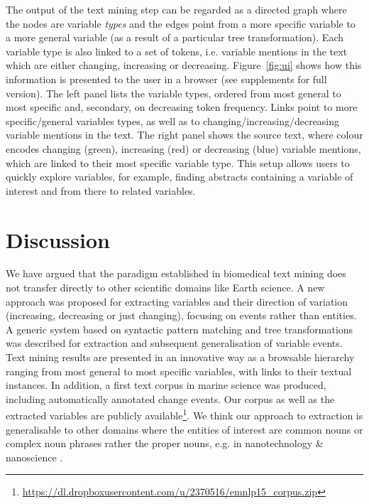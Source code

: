 \documentclass[11pt]{article}
\begin{document}
The output of the text mining step can be regarded as a directed graph where the nodes are variable \emph{types} and the edges point from a more specific variable to a more general variable (as a result of a particular tree transformation).
Each variable type is also linked to a set of tokens, i.e. variable mentions in the text which are either changing, increasing or decreasing.
Figure~\ref{fig:ui}  shows how this information is presented to the user in a browser (see supplements for full version).
The left panel lists the variable types, ordered from most general to most specific and, secondary, on decreasing token frequency.
Links point to more specific/general variables types, as well as to changing/increasing/decreasing variable mentions in the text.
The right panel shows the source text, where colour encodes changing (green), increasing (red) or decreasing (blue) variable mentions, which are linked to their most specific variable type.
This setup allows users to quickly explore variables, for example, finding abstracts containing a variable of interest and from there to related variables.   
 
\section{Discussion}

We have argued that the paradigm established in biomedical text mining does not transfer directly to other scientific domains like Earth science.
A new approach was proposed for extracting variables and their direction of variation (increasing, decreasing or just changing), focusing on events rather than entities.
A generic system based on syntactic pattern matching and tree transformations was described for extraction and subsequent generalisation of variable events.
Text mining results are presented in an innovative way as a browsable hierarchy ranging from most general to most specific variables, with links to their textual instances.
In addition, a first text corpus in marine science was produced, including automatically annotated change events.
Our corpus as well as the extracted variables are publicly available\footnote{\url{https://dl.dropboxusercontent.com/u/2370516/emnlp15_corpus.zip}}.
We think our approach to extraction is generalisable to other domains where the entities of interest are common nouns or complex noun phrases rather the proper nouns, e.g. in nanotechnology \& nanoscience \cite{Kostoff20071733}.
\end{document}
